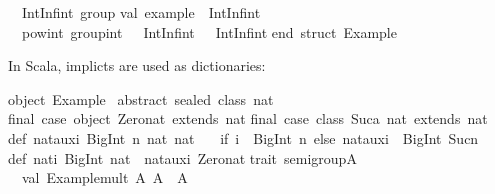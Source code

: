 \begin{isabellebody}
\begin{isamarkuptext}
\ \ IntInf{\isachardot}int\ group{\isacharsemicolon}\isanewline
\isanewline
val\ example\ {\isacharcolon}\ IntInf{\isachardot}int\ {\isacharequal}\isanewline
\ \ pow{\isacharunderscore}int\ group{\isacharunderscore}int\ {\isacharparenleft}{}{}\ {\isacharcolon}\ IntInf{\isachardot}int{\isacharparenright}\ {\isacharparenleft}{\isachartilde}{}\ {\isacharcolon}\ IntInf{\isachardot}int{\isacharparenright}{\isacharsemicolon}\isanewline
\isanewline
end{\isacharsemicolon}\ {\isacharparenleft}{\isacharasterisk}struct\ Example{\isacharasterisk}{\isacharparenright}\isanewline%
\end{isamarkuptext}%
\isamarkuptrue%
%
\endisatagtypewriter
{\isafoldtypewriter}%
%
\isadelimtypewriter
%
\endisadelimtypewriter
%
\begin{isamarkuptext}%
\noindent In Scala, implicts are used as dictionaries:%
\end{isamarkuptext}%
\isamarkuptrue%
%
\isadeliminvisible
%
\endisadeliminvisible
%
\isataginvisible
%
\endisataginvisible
{\isafoldinvisible}%
%
\isadeliminvisible
%
\endisadeliminvisible
%
\isadelimtypewriter
%
\endisadelimtypewriter
%
\isatagtypewriter
%
\begin{isamarkuptext}%
object\ Example\ {\isacharbraceleft}\isanewline
\isanewline
abstract\ sealed\ class\ nat\isanewline
final\ case\ object\ Zero{\isacharunderscore}nat\ extends\ nat\isanewline
final\ case\ class\ Suc{\isacharparenleft}a{\isacharcolon}\ nat{\isacharparenright}\ extends\ nat\isanewline
\isanewline
def\ nat{\isacharunderscore}aux{\isacharparenleft}i{\isacharcolon}\ BigInt{\isacharcomma}\ n{\isacharcolon}\ nat{\isacharparenright}{\isacharcolon}\ nat\ {\isacharequal}\isanewline
\ \ {\isacharparenleft}if\ {\isacharparenleft}i\ {\isacharless}{\isacharequal}\ BigInt{\isacharparenleft}{}{\isacharparenright}{\isacharparenright}\ n\ else\ nat{\isacharunderscore}aux{\isacharparenleft}i\ {\isacharminus}\ BigInt{\isacharparenleft}{}{\isacharparenright}{\isacharcomma}\ Suc{\isacharparenleft}n{\isacharparenright}{\isacharparenright}{\isacharparenright}\isanewline
\isanewline
def\ nat{\isacharparenleft}i{\isacharcolon}\ BigInt{\isacharparenright}{\isacharcolon}\ nat\ {\isacharequal}\ nat{\isacharunderscore}aux{\isacharparenleft}i{\isacharcomma}\ Zero{\isacharunderscore}nat{\isacharparenright}\isanewline
\isanewline
trait\ semigroup{\isacharbrackleft}A{\isacharbrackright}\ {\isacharbraceleft}\isanewline
\ \ val\ {\isacharbackquote}Example{\isachardot}mult{\isacharbackquote}{\isacharcolon}\ {\isacharparenleft}A{\isacharcomma}\ A{\isacharparenright}\ {\isacharequal}{\isachargreater}\ A\isanewline

\end{isamarkuptext}
\end{isabellebody}
